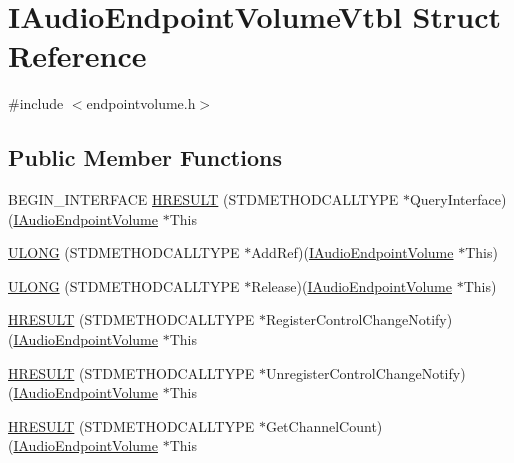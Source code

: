 \hypertarget{struct_i_audio_endpoint_volume_vtbl}{}\section{I\+Audio\+Endpoint\+Volume\+Vtbl Struct Reference}
\label{struct_i_audio_endpoint_volume_vtbl}


{\ttfamily \#include $<$endpointvolume.\+h$>$}

\subsection*{Public Member Functions}
\begin{DoxyCompactItemize}
\item 
B\+E\+G\+I\+N\+\_\+\+I\+N\+T\+E\+R\+F\+A\+CE \hyperlink{struct_i_audio_endpoint_volume_vtbl_a924492d64de503c8243cb4b81e011856}{H\+R\+E\+S\+U\+LT} (S\+T\+D\+M\+E\+T\+H\+O\+D\+C\+A\+L\+L\+T\+Y\+PE $\ast$Query\+Interface)(\hyperlink{endpointvolume_8h_a0aa518a24cb3834bf372f46cfc94e3cf}{I\+Audio\+Endpoint\+Volume} $\ast$This
\item 
\hyperlink{struct_i_audio_endpoint_volume_vtbl_ae774e44037cf6964a6966d5c1fdabfe8}{U\+L\+O\+NG} (S\+T\+D\+M\+E\+T\+H\+O\+D\+C\+A\+L\+L\+T\+Y\+PE $\ast$Add\+Ref)(\hyperlink{endpointvolume_8h_a0aa518a24cb3834bf372f46cfc94e3cf}{I\+Audio\+Endpoint\+Volume} $\ast$This)
\item 
\hyperlink{struct_i_audio_endpoint_volume_vtbl_a935cee52fcd46ebe75384cd31a155c15}{U\+L\+O\+NG} (S\+T\+D\+M\+E\+T\+H\+O\+D\+C\+A\+L\+L\+T\+Y\+PE $\ast$Release)(\hyperlink{endpointvolume_8h_a0aa518a24cb3834bf372f46cfc94e3cf}{I\+Audio\+Endpoint\+Volume} $\ast$This)
\item 
\hyperlink{struct_i_audio_endpoint_volume_vtbl_aee5bab31048fd148826a9bb7400e2efe}{H\+R\+E\+S\+U\+LT} (S\+T\+D\+M\+E\+T\+H\+O\+D\+C\+A\+L\+L\+T\+Y\+PE $\ast$Register\+Control\+Change\+Notify)(\hyperlink{endpointvolume_8h_a0aa518a24cb3834bf372f46cfc94e3cf}{I\+Audio\+Endpoint\+Volume} $\ast$This
\item 
\hyperlink{struct_i_audio_endpoint_volume_vtbl_a32c515aed8814b7f640c707e6891ca86}{H\+R\+E\+S\+U\+LT} (S\+T\+D\+M\+E\+T\+H\+O\+D\+C\+A\+L\+L\+T\+Y\+PE $\ast$Unregister\+Control\+Change\+Notify)(\hyperlink{endpointvolume_8h_a0aa518a24cb3834bf372f46cfc94e3cf}{I\+Audio\+Endpoint\+Volume} $\ast$This
\item 
\hyperlink{struct_i_audio_endpoint_volume_vtbl_a1df586474fd28ed17fed73a8ee789792}{H\+R\+E\+S\+U\+LT} (S\+T\+D\+M\+E\+T\+H\+O\+D\+C\+A\+L\+L\+T\+Y\+PE $\ast$Get\+Channel\+Count)(\hyperlink{endpointvolume_8h_a0aa518a24cb3834bf372f46cfc94e3cf}{I\+Audio\+Endpoint\+Volume} $\ast$This

\end{DoxyCompactItemize}

